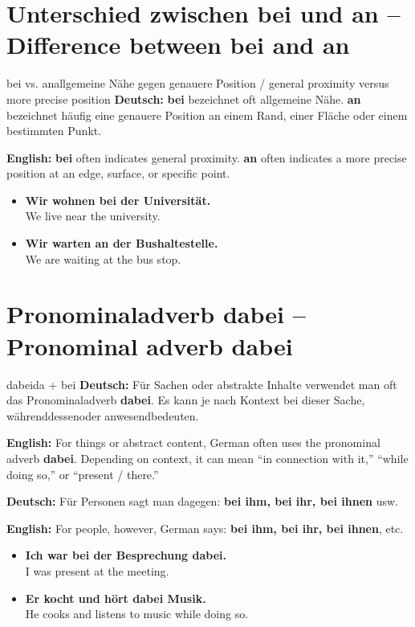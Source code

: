 \documentclass[a4paper,11pt]{article}
\newcommand{\GermanText}[1]{\textbf{Deutsch: }#1\par}
\newcommand{\EnglishText}[1]{{\small\color{SoftGray}\textbf{English: }#1\par}}
\newcommand{\ExampleItem}[2]{\item \textbf{#1}\\{\small\color{SoftGray}#2}}
\begin{document}
\section{Unterschied zwischen bei und an -- Difference between bei and an}
\begin{grammarentry}{bei vs. an}{allgemeine Nähe gegen genauere Position / general proximity versus more precise position}
\GermanText{\textbf{bei} bezeichnet oft allgemeine Nähe. \textbf{an} bezeichnet häufig eine genauere Position an einem Rand, einer Fläche oder einem bestimmten Punkt.}
\EnglishText{\textbf{bei} often indicates general proximity. \textbf{an} often indicates a more precise position at an edge, surface, or specific point.}
\end{grammarentry}
\begin{exbox}\begin{itemize}
\ExampleItem{Wir wohnen bei der Universität.}{We live near the university.}
\ExampleItem{Wir warten an der Bushaltestelle.}{We are waiting at the bus stop.}
\end{itemize}\end{exbox}

\section{Pronominaladverb dabei -- Pronominal adverb dabei}
\begin{grammarentry}{dabei}{da + bei}
\GermanText{Für Sachen oder abstrakte Inhalte verwendet man oft das Pronominaladverb \textbf{dabei}. Es kann je nach Kontext \glqq bei dieser Sache\grqq, \glqq währenddessen\grqq oder \glqq anwesend\grqq bedeuten.}
\EnglishText{For things or abstract content, German often uses the pronominal adverb \textbf{dabei}. Depending on context, it can mean ``in connection with it,'' ``while doing so,'' or ``present / there.''}
\GermanText{Für Personen sagt man dagegen: \textbf{bei ihm, bei ihr, bei ihnen} usw.}
\EnglishText{For people, however, German says: \textbf{bei ihm, bei ihr, bei ihnen}, etc.}
\end{grammarentry}
\begin{exbox}\begin{itemize}
\ExampleItem{Ich war bei der Besprechung dabei.}{I was present at the meeting.}
\ExampleItem{Er kocht und hört dabei Musik.}{He cooks and listens to music while doing so.}
\end{itemize}\end{exbox}
\end{document}
